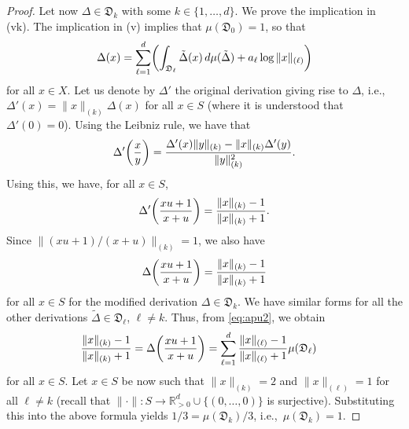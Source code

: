 \documentclass[12pt,a4paper,reqno]{amsart}
\theoremstyle{definition}
\newcommand{\mf}[1]{\mathfrak{#1}}
\newcommand{\R}{\mathbb R}
\let\originalleft\left
\let\originalright\right
\renewcommand{\left}{\mathopen{}\mathclose\bgroup\originalleft}
\renewcommand{\right}{\aftergroup\egroup\originalright}
\begin{document}
\begin{proof}
Let now $\Delta\in\mf D_k$ with some $k\in\{1,\ldots,d\}$. We prove the implication in (vk). The implication in (v) implies that $\mu(\mf D_0)=1$, so that
\begin{equation}\label{eq:apu2}
\Delta(x)=\sum_{\ell=1}^d\left(\int_{\mf D_\ell}\tilde{\Delta}(x)\,d\mu(\tilde{\Delta})+a_\ell\log{\|x\|_{(\ell)}}\right)
\end{equation}
for all $x\in X$. Let us denote by $\Delta'$ the original derivation giving rise to $\Delta$, i.e.,\ $\Delta'(x)=\|x\|_{(k)}\Delta(x)$ for all $x\in S$ (where it is understood that $\Delta'(0)=0$). Using the Leibniz rule, we have that
$$
\Delta'\left(\frac{x}{y}\right)=\frac{\Delta'(x)\|y\|_{(k)}-\|x\|_{(k)}\Delta'(y)}{\|y\|_{(k)}^2}.
$$
Using this, we have, for all $x\in S$,
$$
\Delta'\left(\frac{xu+1}{x+u}\right)=\frac{\|x\|_{(k)}-1}{\|x\|_{(k)}+1}.
$$
Since $\|(xu+1)/(x+u)\|_{(k)}=1$, we also have
$$
\Delta\left(\frac{xu+1}{x+u}\right)=\frac{\|x\|_{(k)}-1}{\|x\|_{(k)}+1}
$$
for all $x\in S$ for the modified derivation $\Delta\in\mf D_k$. We have similar forms for all the other derivations $\tilde{\Delta}\in\mf D_\ell$, $\ell\neq k$. Thus, from \eqref{eq:apu2}, we obtain
\begin{align*}
\frac{\|x\|_{(k)}-1}{\|x\|_{(k)}+1}&=\Delta\left(\frac{xu+1}{x+u}\right)=\sum_{\ell=1}^d\frac{\|x\|_{(\ell)}-1}{\|x\|_{(\ell)}+1}\mu(\mf D_\ell)
\end{align*}
for all $x\in S$. Let $x\in S$ be now such that $\|x\|_{(k)}=2$ and $\|x\|_{(\ell)}=1$ for all $\ell\neq k$ (recall that $\|\cdot\|:S\to\R_{>0}^d\cup\{(0,\ldots,0)\}$ is surjective). Substituting this into the above formula yields $1/3=\mu(\mf D_k)/3$, i.e.,\ $\mu(\mf D_k)=1$.


\end{proof}
\end{document}
